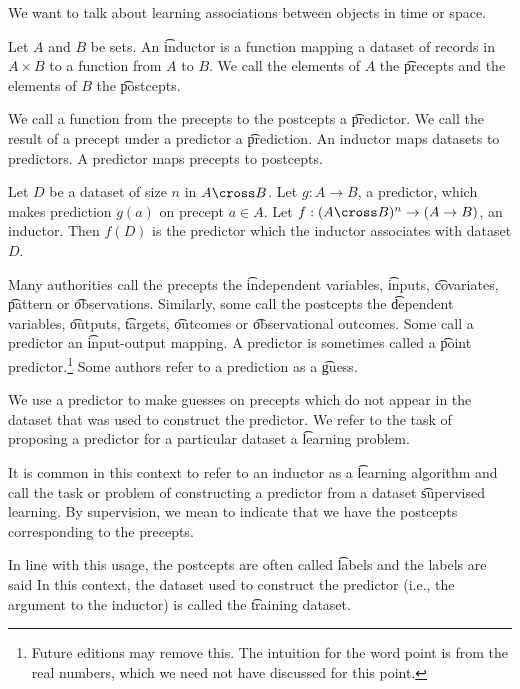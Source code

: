 

We want to talk about learning
associations between objects
in time or space.


Let $A$ and $B$ be sets.
An \t{inductor} is a function mapping a dataset of records in $A \times B$ to a function from $A$ to $B$.
We call the elements of $A$ the \t{precepts} and the elements of $B$ the \t{postcepts}.

We call a function from the precepts to the postcepts a \t{predictor}.
We call the result of a precept under a predictor a \t{prediction}.
An inductor maps datasets to predictors.
A predictor maps precepts to postcepts.


Let $D$ be a dataset of size $n$ in $A \cross B$.
Let $g: A \to B$, a predictor, which makes prediction $g(a)$ on precept $a \in A$.
Let $f: (A \cross B)^n \to (A \to B)$, an inductor.
Then $f(D)$ is the predictor which the inductor associates with dataset $D$.


Many authorities call the precepts the \t{independent variables}, \t{inputs}, \t{covariates}, \t{pattern} or \t{observations}.
Similarly, some call the postcepts the \t{dependent variables}, \t{outputs}, \t{targets}, \t{outcomes} or \t{observational outcomes}.
Some call a predictor an \t{input-output} mapping.
A predictor is sometimes called a \t{point predictor}.\footnote{Future editions may remove this. The intuition for the word point is from the real numbers, which we need not have discussed for this point.}
Some authors refer to a prediction as a \t{guess}.


We use a predictor to make guesses on precepts which do not appear in the dataset that was used to construct the predictor.
We refer to the task of proposing a predictor for a particular dataset a \t{learning problem}.

It is common in this context to refer to an inductor as a \t{learning algorithm} and call the task or problem of constructing a predictor from a dataset  \t{supervised learning}.
By supervision, we mean to indicate that we have the postcepts corresponding to the precepts.

In line with this usage, the postcepts are often called \t{labels} and the labels are said 
In this context, the dataset used to construct the predictor (i.e., the argument to the inductor) is called the \t{training dataset}.

